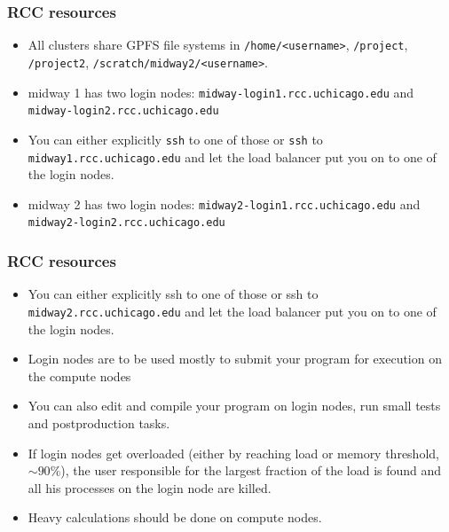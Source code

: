 \documentclass{beamer}
\begin{document}
\begin{frame}[fragile]
  \frametitle{RCC resources}
  \begin{itemize}
  \item All clusters share GPFS file systems in  {\color{mycolorcli}\verb|/home/<username>|},  {\color{mycolorcli}\verb|/project|},  {\color{mycolorcli}\verb|/project2|},  {\color{mycolorcli}\verb|/scratch/midway2/<username>|}. 
  \item midway 1 has two login nodes: {\color{mycolorcli}\verb|midway-login1.rcc.uchicago.edu|} and {\color{mycolorcli}\verb|midway-login2.rcc.uchicago.edu|}
  \item You can either explicitly {\color{mycolorcli}\verb|ssh|} to one of those or {\color{mycolorcli}\verb|ssh|} to {\color{mycolorcli}\verb|midway1.rcc.uchicago.edu|} 
    and let the load balancer put you on to one of the login nodes.
  \item midway 2 has two login nodes: {\color{mycolorcli}\verb|midway2-login1.rcc.uchicago.edu|} and {\color{mycolorcli}\verb|midway2-login2.rcc.uchicago.edu|}
  \end{itemize}
\end{frame}


\begin{frame}[fragile]
  \frametitle{RCC resources}
  \begin{itemize}
  \item You can either explicitly ssh to one of those or ssh to  {\color{mycolorcli}\verb|midway2.rcc.uchicago.edu|} and let the load balancer put you on to one of the login nodes.
  \item Login nodes are to be used mostly to submit your program for execution on the compute nodes
  \item You can also edit and compile your program on login nodes, run small tests and postproduction tasks.
  \item If login nodes get overloaded (either by reaching load or memory threshold, $\sim 90\%$), the user responsible for the largest fraction of the load is found and all his processes on the login node are killed.
  \item Heavy calculations should be done on compute nodes.
  \end{itemize}
\end{frame}
\end{document}
